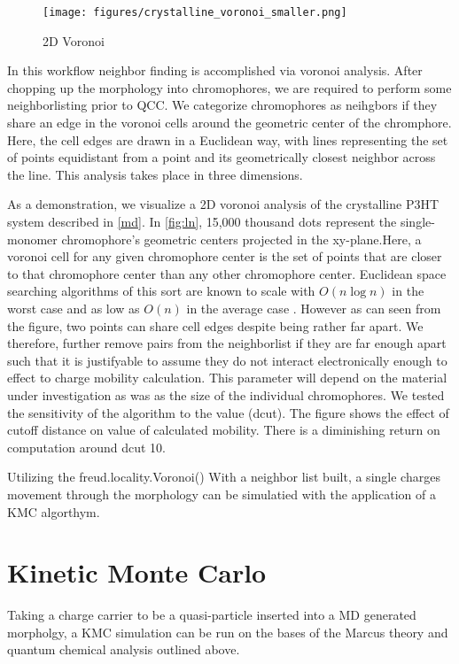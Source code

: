 \begin{figure}
  \center
  \texttt{[image: figures/crystalline\_voronoi\_smaller.png]} 
  \caption{2D Voronoi}
  \label{fig:2d}
\end{figure}

 In this workflow neighbor finding is accomplished via
voronoi analysis.
After chopping up the morphology into chromophores, we are required to perform some neighborlisting prior to
QCC. We categorize chromophores as
neihgbors if they share an edge in the voronoi cells around the geometric center of the chromphore. Here, the
cell edges are drawn in a Euclidean way, with lines representing the set of points equidistant from a point
and its geometrically closest neighbor across the line. This analysis takes place in three dimensions. 

As a demonstration, we visualize a 2D voronoi analysis of the crystalline 
P3HT system described in \autoref{md}.
In \autoref{fig:ln}, 15,000 thousand dots represent the single-monomer chromophore's geometric centers projected
in the xy-plane.Here,
a voronoi cell for any given chromophore center is the set of points that are closer to that chromophore
center than any other chromophore center. Euclidean space searching algorithms of
this sort are known to scale with $O(n\log{n})$ in the worst case and as low as $O(n)$ in the average case
\cite{Bentley1980}.
However as can seen from the figure, two points can share cell edges despite being rather far apart. We
therefore, further remove pairs from the neighborlist if they are far enough apart such that it is justifyable
to assume they do not interact electronically enough to effect to charge mobility calculation. This parameter will
depend on the material under investigation as was as the size of the individual chromophores. We tested the
sensitivity of the algorithm to the value (dcut). The figure shows the effect of cutoff distance on value of
calculated mobility. There is a diminishing return on computation around dcut 10. 

Utilizing the freud.locality.Voronoi() 
With a neighbor list built, a single charges movement through the morphology can be simulatied with the
application of a KMC algorthym.

\section{Kinetic Monte Carlo}
\label{KMC}
Taking a charge carrier to be a quasi-particle inserted into a MD generated morpholgy, a KMC
simulation can be run on the bases of the Marcus theory and quantum chemical analysis outlined above. 


